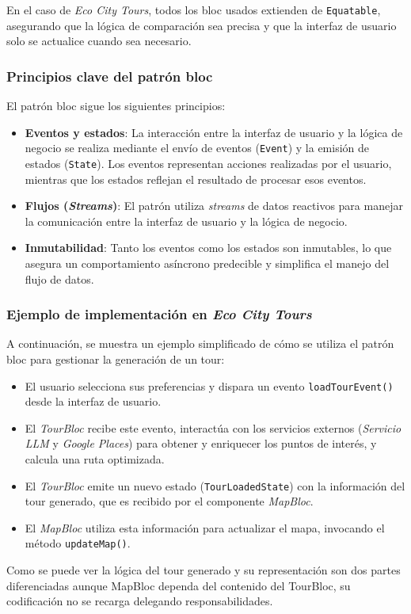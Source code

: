En el caso de \textit{Eco City Tours}, todos los \acrshort{bloc} usados extienden de \texttt{Equatable}, asegurando que la lógica de comparación sea precisa y que la interfaz de usuario solo se actualice cuando sea necesario. 

\subsubsection{Principios clave del patrón \acrshort{bloc}}
	El patrón \acrfull{bloc} sigue los siguientes principios:
	\begin{itemize}
		\item \textbf{Eventos y estados}: La interacción entre la interfaz de usuario y la lógica de negocio se realiza mediante el envío de eventos (\texttt{Event}) y la emisión de estados (\texttt{State}). Los eventos representan acciones realizadas por el usuario, mientras que los estados reflejan el resultado de procesar esos eventos.
		\item \textbf{Flujos (\textit{Streams})}: El patrón utiliza \textit{streams} de datos reactivos para manejar la comunicación entre la interfaz de usuario y la lógica de negocio.
		\item \textbf{Inmutabilidad}: Tanto los eventos como los estados son inmutables, lo que asegura un comportamiento asíncrono predecible y simplifica el manejo del flujo de datos.
	\end{itemize}
	

\subsubsection{Ejemplo de implementación en \textit{Eco City Tours}}
A continuación, se muestra un ejemplo simplificado de cómo se utiliza el patrón \acrshort{bloc} para gestionar la generación de un tour:
\begin{itemize}
	\item El usuario selecciona sus preferencias y dispara un evento \texttt{loadTourEvent()} desde la interfaz de usuario.
	\item El \textit{TourBloc} recibe este evento, interactúa con los servicios externos (\textit{Servicio LLM} y \textit{Google Places}) para obtener y enriquecer los puntos de interés, y calcula una ruta optimizada.
	\item El \textit{TourBloc} emite un nuevo estado (\texttt{TourLoadedState}) con la información del tour generado, que es recibido por el componente \textit{MapBloc}.
	\item El \textit{MapBloc} utiliza esta información para actualizar el mapa, invocando el método \texttt{updateMap()}.
\end{itemize}
Como se puede ver la lógica del tour generado y su representación son dos partes diferenciadas aunque MapBloc dependa del contenido del TourBloc, su codificación no se recarga delegando responsabilidades.

